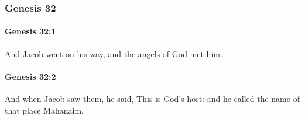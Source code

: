 	\subsubsection{Genesis 32} %
		\label{GENESIS-32}

		\paragraph{Genesis 32:1} %
			\label{GENESIS-32-1}

			And Jacob went on his way, and the angels of God met him.


		\paragraph{Genesis 32:2} %
			\label{GENESIS-32-2}

			And when Jacob saw them, he said, This is God's host: and he called the name of that place Mahanaim.

